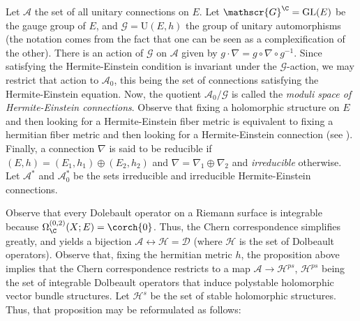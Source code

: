 Let \(\mathscr{A}\) the set of all unitary connections on \(E\). Let \(\mathscr{G}^\C=\mathrm{GL}(E)\) be the gauge group of \(E\), and \(\mathscr{G}=\mathrm{U}(E,h)\) the group of unitary automorphisms (the notation comes from the fact that one can be seen as a complexification of the other). There is an action of \(\mathscr{G}\) on \(\mathscr{A}\) given by \(g \cdot \nabla=g\circ \nabla \circ g^{-1}\). Since satisfying the Hermite-Einstein condition is invariant under the \(\mathscr{G}\)-action, we may restrict that action to \(\mathscr{A}_0\), this being the set of connections satisfying the Hermite-Einstein equation. Now, the quotient \(\mathscr{A}_0/\mathscr{G}\) is called the \textit{moduli space of Hermite-Einstein connections}. Observe that fixing a holomorphic structure on \(E\) and then looking for a Hermite-Einstein fiber metric is equivalent to fixing a hermitian fiber metric and then looking for a Hermite-Einstein connection (see \parencite[Page 251]{garcia2007differential}). Finally, a connection \(\nabla\) is said to be reducible if \((E,h)=(E_1, h_1)\oplus (E_2, h_2)\) and \(\nabla=\nabla_1 \oplus \nabla_2\) and \textit{irreducible} otherwise. Let \(\mathscr{A}^*\) and \(\mathscr{A}_0^*\) be the sets irreducible and irreducible Hermite-Einstein connections. 


Observe that every Dolebault operator on a Riemann surface is integrable because \(\Omega_\C^{(0,2)}(X;E)=\corch{0}\). Thus, the Chern correspondence simplifies greatly, and yields a bijection \(\mathscr{A} \leftrightarrow \mathscr{H}=\mathscr{D}\) (where \(\mathscr{H}\) is the set of Dolbeault operators). Observe that, fixing the hermitian metric \(h\), the proposition above implies that the Chern correspondence restricts to a map \(\mathscr{A} \to \mathscr{H}^{ps}\), \(\mathscr{H}^{ps}\) being the set of integrable Dolbeault operators that induce polystable holomorphic vector bundle structures. Let \(\mathscr{H}^s\) be the set of stable holomorphic structures. Thus, that proposition may be reformulated as follows: \\


